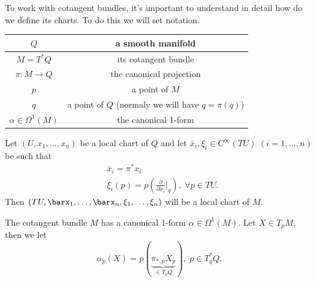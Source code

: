 To work with cotangent bundles, it's important to understand in detail how do we define its charts. 
To do this we will set notation. 

\begin{center}
    \begin{tabular}{|c|c|}
        \hline
       $Q$ & a smooth manifold\\
       \hline 
       $M=T^*Q$ & its cotangent bundle\\
       \hline 
       $\pi: M\to Q$ & the canonical projection\\  
        \hline 
        $p$ & a point of $M$\\
        \hline
        $q$ & a point of $Q$ (normaly we will have $q=\pi(q)$)\\
        \hline 
        $\alpha \in \Omega^1(M)$ & the canonical 1-form\\
        \hline
    \end{tabular}
\end{center}

\begin{dang}
    \begin{notation}
        Let $(U,x_1,\dots,x_n)$ be a local chart of $Q$ and let $\bar{x}_i,\xi_i\in C^\infty(TU)\;(i=1,\dots,n)$ be such that 
    \begin{equation}
        \begin{aligned}
            &\bar{x}_i=\pi^*x_i\\
            &\xi_i(p)=p(\frac{\partial}{\partial x_i}\bigg|_q),\;\forall p\in TU.
        \end{aligned}
    \end{equation}
    Then $(TU,\barx_1,\dots,\barx_n,\xi_1,\dots,\xi_n)$ will be a local chart of $M$.
    \end{notation}
\end{dang}

\begin{dang}
    \begin{lemma}
         The cotangent bundle $M$ has a canonical 1-form $\alpha\in\Omega^1(M)$. Let $X\in T_pM$, then we let  
         \begin{equation}
            \alpha_p(X)=  p(\underset{\in T_qQ}{\underbrace{\pi_{*,p}X_p}}),\; p\in T_q^*Q.
         \end{equation}
    \end{lemma}
\end{dang}

